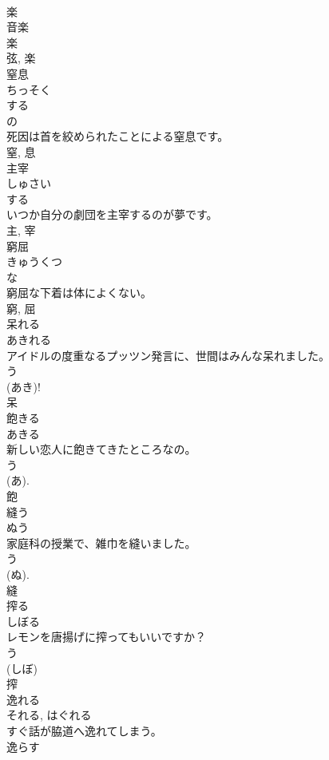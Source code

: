 \documentclass[8pt]{extreport}
\begin{document}
\begin{CJK}{UTF8}{min}
\\	楽 
\\	音楽 
\\	楽 
\\	弦, 楽	
\\	窒息	
\\	ちっそく	
\\	する 
\\	の 
\\	死因は首を絞められたことによる窒息です。	
\\	窒, 息	
\\	主宰	
\\	しゅさい	
\\	する 
\\	いつか自分の劇団を主宰するのが夢です。	
\\	主, 宰	
\\	窮屈	
\\	きゅうくつ	
\\	な 
\\	窮屈な下着は体によくない。	
\\	窮, 屈	
\\	呆れる	
\\	あきれる	
\\	アイドルの度重なるプッツン発言に、世間はみんな呆れました。	
\\	う 
\\	(あき)!
\\	呆	
\\	飽きる	
\\	あきる	
\\	新しい恋人に飽きてきたところなの。	
\\	う 
\\	(あ).
\\	飽	
\\	縫う	
\\	ぬう	
\\	家庭科の授業で、雑巾を縫いました。	
\\	う 
\\	(ぬ). 
\\	縫	
\\	搾る	
\\	しぼる	
\\	レモンを唐揚げに搾ってもいいですか？	
\\	う 
\\	(しぼ) 
\\	搾	
\\	逸れる	
\\	それる, はぐれる	
\\	すぐ話が脇道へ逸れてしまう。	
\\	逸らす 

\end{CJK}
\end{document}
